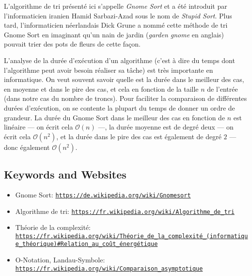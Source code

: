 \documentclass[a4paper,11pt]{report}
\newcommand{\BrochureUrlText}[1]{\texttt{#1}}
\begin{document}
L’algorithme de tri présenté ici s’appelle \emph{Gnome Sort} et a été introduit par l’informaticien iranien Hamid Sarbazi-Azad sous le nom de \emph{Stupid Sort}. Plus tard, l’informaticien néerlandais Dick Grune a nommé cette méthode de tri Gnome Sort en imaginant qu’un nain de jardin (\emph{garden gnome} en anglais) pouvait trier des pots de fleurs de cette façon.

L’analyse de la durée d’exécution d’un algorithme (c’est à dire du temps dont l’algorithme peut avoir besoin réaliser sa tâche) est très importante en informatique. On veut souvent savoir quelle est la durée dans le meilleur des cas, en moyenne et dans le pire des cas, et cela en fonction de la taille ${n}$ de l’entrée (dans notre cas du nombre de troncs). Pour faciliter la comparaison de différentes durées d’exécution, on se contente la plupart du temps de donner un ordre de grandeur. La durée du Gnome Sort dans le meilleur des cas en fonction de ${n}$ est linéaire — on écrit cela ${\mathcal{O}(n)}$ —, la durée moyenne est de degré deux — on écrit cela ${\mathcal{O}(n^2)}$, et la durée dans le pire des cas est également de degré $2$ — donc également ${\mathcal{O}(n^2)}$.

{\raggedright

\subsection*{Keywords and Websites}

\begin{itemize}
  \item Gnome Sort: \href{https://de.wikipedia.org/wiki/Gnomesort}{\BrochureUrlText{https://de.wikipedia.org/wiki/Gnomesort}}
  \item Algorithme de tri: \href{https://fr.wikipedia.org/wiki/Algorithme_de_tri}{\BrochureUrlText{https://fr.wikipedia.org/wiki/Algorithme\_de\_tri}}
  \item Théorie de la complexité: \href{https://fr.wikipedia.org/wiki/Th\%C3\%A9orie_de_la_complexit\%C3\%A9_(informatique_th\%C3\%A9orique)\#Relation_au_co\%C3\%BBt_\%C3\%A9nerg\%C3\%A9tique}{\BrochureUrlText{https://fr.wikipedia.org/wiki/Théorie\_de\_la\_complexité\_(informatique\_théorique)\#Relation\_au\_coût\_énergétique}}
  \item O-Notation, Landau-Symbole: \href{https://fr.wikipedia.org/wiki/Comparaison_asymptotique}{\BrochureUrlText{https://fr.wikipedia.org/wiki/Comparaison\_asymptotique}}
\end{itemize}


}
\end{document}
